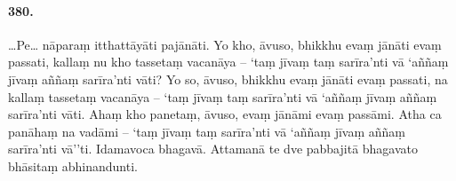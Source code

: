 \paragraph{380.} …Pe… nāparaṃ itthattāyāti pajānāti. Yo kho, āvuso, bhikkhu evaṃ jānāti evaṃ passati, kallaṃ nu kho tassetaṃ vacanāya – ‘taṃ jīvaṃ taṃ sarīra’nti vā ‘aññaṃ jīvaṃ aññaṃ sarīra’nti vāti? Yo so, āvuso, bhikkhu evaṃ jānāti evaṃ passati, na kallaṃ tassetaṃ vacanāya – ‘taṃ jīvaṃ taṃ sarīra’nti vā ‘aññaṃ jīvaṃ aññaṃ sarīra’nti vāti. Ahaṃ kho panetaṃ, āvuso, evaṃ jānāmi evaṃ passāmi. Atha ca panāhaṃ na vadāmi – ‘taṃ jīvaṃ taṃ sarīra’nti vā ‘aññaṃ jīvaṃ aññaṃ sarīra’nti vā’’ti. Idamavoca bhagavā. Attamanā te dve pabbajitā bhagavato bhāsitaṃ abhinandunti.

